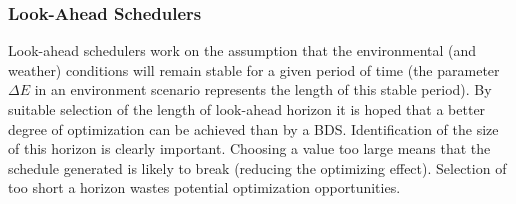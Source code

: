 \documentclass[12pt,a4paper]{article}
\begin{document}
{\subsubsection{Look-Ahead Schedulers}
Look-ahead schedulers work on the assumption that the environmental (and weather) conditions will remain stable for a given period of time (the parameter $\Delta E$ in an environment scenario represents the length of this stable period). By suitable selection of the length of look-ahead horizon it is hoped that a better degree of optimization can be achieved than by a BDS. Identification of the size of this horizon is clearly important. Choosing a value too large means that the schedule generated is likely to break (reducing the optimizing effect). Selection of too short a horizon wastes potential optimization opportunities. 

}
\end{document}
